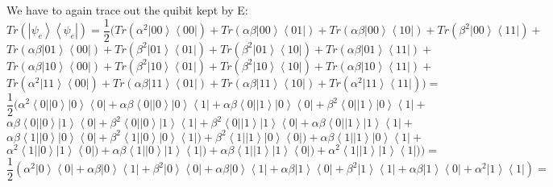 \documentclass[a4paper,10pt]{article}
\newcommand{\bra}[1]{\ensuremath{\left\langle#1\right|}} %
\newcommand{\ket}[1]{\ensuremath{\left|#1\right\rangle}} %
\newcommand{\ap}{\ensuremath{\frac{1}{2}}}
\begin{document}
\begin{enumerate}[1.]
We have to again trace out the quibit kept by E:
$$
Tr(\ket{\psi_e}\bra{\psi_e}) =
\ap ( Tr(\alpha^2\ket{00}\bra{00}) + Tr(\alpha\beta\ket{00}\bra{01})+Tr(\alpha\beta \ket{00}\bra{10}) + Tr(\beta^2\ket{00}\bra{11}) +
$$
$$
Tr(\alpha\beta\ket{01}\bra{00}) +Tr(\beta^2\ket{01}\bra{01}) +Tr(\beta^2\ket{01}\bra{10}) +Tr(\alpha\beta\ket{01}\bra{11}) +
$$
$$
Tr(\alpha\beta\ket{10}\bra{00}) +Tr(\beta^2\ket{10}\bra{01}) + Tr(\beta^2\ket{10}\bra{10}) +Tr(\alpha\beta\ket{10}\bra{11}) + 
$$
$$
Tr(\alpha^2\ket{11}\bra{00}) +Tr(\alpha\beta\ket{11}\bra{01}) + Tr(\alpha\beta \ket{11}\bra{10})+Tr(\alpha^2\ket{11}\bra{11}))=
$$
$$
\ap ( \alpha^2\bra{0}\ket{0}\ket{0}\bra{0} + \alpha\beta\bra{0}\ket{0}\ket{0}\bra{1}+\alpha\beta\bra{0}\ket{1}\ket{0}\bra{0} + \beta^2\bra{0}\ket{1}\ket{0}\bra{1} +
$$
$$
\alpha\beta\bra{0}\ket{0}\ket{1}\bra{0} + \beta^2\bra{0}\ket{0}\ket{1}\bra{1} +\beta^2\bra{0}\ket{1}\ket{1}\bra{0} + \alpha\beta\bra{0}\ket{1}\ket{1}\bra{1} +
$$
$$
\alpha\beta\bra{1}\ket{0}\ket{0}\bra{0} + \beta^2\bra{1}\ket{0}\ket{0}\bra{1}) + \beta^2\bra{1}\ket{1}\ket{0}\bra{0}) + \alpha\beta\bra{1}\ket{1}\ket{0}\bra{1} + 
$$
$$
\alpha^2\bra{1}\ket{0}\ket{1}\bra{0}) +\alpha\beta\bra{1}\ket{0}\ket{1}\bra{1}) + \alpha\beta\bra{1}\ket{1}\ket{1}\bra{0})+\alpha^2\bra{1}\ket{1}\ket{1}\bra{1}))=
$$
$$
\ap (\alpha^2\ket{0}\bra{0} + \alpha\beta\ket{0}\bra{1} + \beta^2\ket{0}\bra{0} + \alpha\beta\ket{0}\bra{1} + \alpha\beta\ket{1}\bra{0} + \beta^2\ket{1}\bra{1} + \alpha\beta\ket{1}\bra{0} + \alpha^2\ket{1}\bra{1})=
$$


\end{enumerate}
\end{document}
